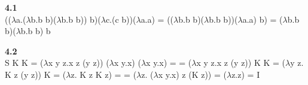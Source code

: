 \documentclass{article}
\begin{document}
\textbf{4.1}\\
(($\lambda$a.($\lambda$b.b b)($\lambda$b.b b)) b)($\lambda$c.(c b))($\lambda$a.a) = (($\lambda$b.b b)($\lambda$b.b b))($\lambda$a.a) b) = ($\lambda$b.b b)($\lambda$b.b b) b


\textbf{4.2}\\
S K K = ($ \lambda $x y z.x z (y z)) ($ \lambda $x y.x) ($ \lambda $x y.x) = 
   = ($ \lambda $x y z.x z (y z)) K K = ($ \lambda $y z. K z (y z)) K = ($ \lambda $z. K z K z) = 
   = ($ \lambda $z. ($ \lambda $x y.x) z (K z)) = ($ \lambda $z.z) = I\par
   
  
\end{document}
